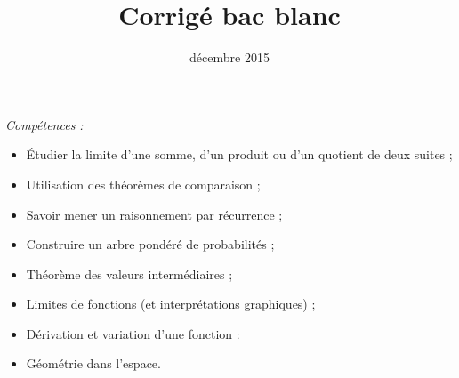 \documentclass[12pt,a4paper]{article}
\title{Corrigé bac blanc \no{1}}
\author{\bsc{Jumel}}
\date{décembre 2015}
\makeatletter
\theoremstyle{break}
\theoremstyle{nobreak}
\theoremstyle{nonumberplain}
\renewcommand{\maketitle}%
{\framebox{%
    \begin{minipage}{0.98\linewidth}%
      \begin{center}%
        \Large \@title ~-- \@author \\%
        \@date%
      \end{center}%
  \end{minipage}}%
  \normalsize%
}
\makeatother
\begin{document}
\maketitle

\emph{Compétences :}
\begin{itemize}
  \item Étudier la limite d'une somme, d'un produit ou d'un quotient de
    deux suites ;
  \item Utilisation des théorèmes de comparaison ;
  \item Savoir mener un raisonnement par récurrence ;
  \item Construire un arbre pondéré de probabilités ;
  \item Théorème des valeurs intermédiaires ;
  \item Limites de fonctions (et interprétations graphiques) ;
  \item Dérivation et variation d'une fonction :
  \item Géométrie dans l'espace.
\end{itemize}
\end{document}
